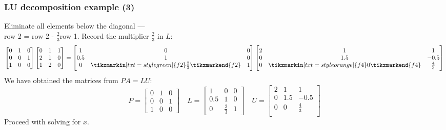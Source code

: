 \begin{frame}[fragile]
  \frametitle{LU decomposition example (3)}
    Eliminate all elements below the diagonal ---\\
    row 2 = row 2 - $\frac{2}{3}$row 1. Record the multiplier $\frac{2}{3}$ in $L$:
  \[
    \begin{bmatrix}
      0 & 1 & 0\\
      0 & 0 & 1 \\
      1 & 0 & 0
    \end{bmatrix} 
    \begin{bmatrix}
      0 & 1 & 1\\
      2 & 1 & 0\\
      1 & 2 & 0
      \end{bmatrix}= 
      \begin{bmatrix}
      1 & 0 & 0\\
      0.5 & 1 & 0\\
      0 & \tikzmarkin[txt=style green]{f2}\frac{2}{3}\tikzmarkend{f2} & 1
      \end{bmatrix}
      \begin{bmatrix}
      2 & 1 & 1\\
      0 & 1.5 & -0.5 \\
      0 & \tikzmarkin[txt=style orange]{f4}0\tikzmarkend{f4} & \frac{4}{3}\\
      \end{bmatrix}
  \]
  \pause
  We have obtained the matrices from $PA=LU$:
  \[
    P = \begin{bmatrix}
      0 & 1 & 0\\
      0 & 0 & 1 \\
      1 & 0 & 0
    \end{bmatrix} \quad
    L=\begin{bmatrix}
      1 & 0 & 0\\
      0.5 & 1 & 0\\
      0 & \frac{2}{3} & 1
      \end{bmatrix} \quad
      U = \begin{bmatrix}
      2 & 1 & 1\\
      0 & 1.5 & -0.5 \\
      0 & 0 & \frac{4}{3}\\
      \end{bmatrix}
  \]
  Proceed with solving for $x$.
\end{frame}


